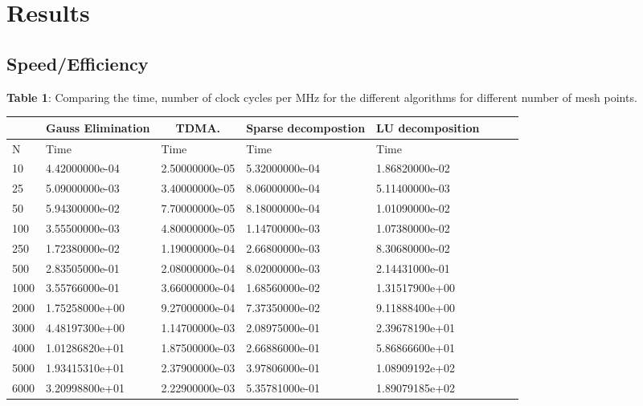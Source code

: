 \documentclass[11pt,a4paper,english,final]{article}
\numberwithin{equation}{section}
\begin{document}
\section{Results}

\subsection{Speed/Efficiency}

\begin{center}
\textbf{Table 1}: Comparing the time, number of clock cycles per MHz for the different algorithms for different number of mesh points.  

\begin{tabular}{|l|l|l|l|l|l|l|l|}
\hline
\multicolumn{1}{|c|}{ } & \multicolumn{1}{|c|}{Gauss Elimination} & \multicolumn{1}{|c|}{TDMA.} & \multicolumn{1}{|c|}{Sparse decompostion} & \multicolumn{1}{|c|}{LU decomposition}  \\
\hline
N & Time & Time & Time & Time  \\
\hline
10 & 4.42000000e-04 &   2.50000000e-05 &   5.32000000e-04 & 1.86820000e-02 \\
25 & 5.09000000e-03 &   3.40000000e-05 &   8.06000000e-04 & 5.11400000e-03 \\
50 & 5.94300000e-02 &   7.70000000e-05 &   8.18000000e-04 & 1.01090000e-02 \\
100 & 3.55500000e-03 &   4.80000000e-05 &   1.14700000e-03 & 1.07380000e-02 \\
250 & 1.72380000e-02 &   1.19000000e-04 &   2.66800000e-03 & 8.30680000e-02 \\
500 & 2.83505000e-01 &   2.08000000e-04 &   8.02000000e-03 & 2.14431000e-01 \\
1000 & 3.55766000e-01 &   3.66000000e-04 &   1.68560000e-02 & 1.31517900e+00 \\
2000 & 1.75258000e+00 &   9.27000000e-04 &   7.37350000e-02 & 9.11888400e+00 \\
3000 & 4.48197300e+00 &   1.14700000e-03 &   2.08975000e-01 & 2.39678190e+01 \\
4000 & 1.01286820e+01 &   1.87500000e-03 &   2.66886000e-01 & 5.86866600e+01 \\
5000 & 1.93415310e+01 &   2.37900000e-03 &   3.97806000e-01 & 1.08909192e+02 \\
6000 & 3.20998800e+01 &   2.22900000e-03 &   5.35781000e-01 & 1.89079185e+02 \\
\hline
\end{tabular}
\end{center}
\end{document}
